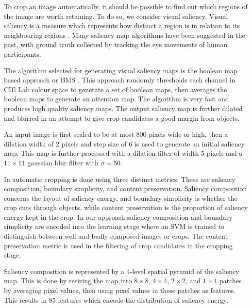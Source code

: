 To crop an image automatically, it should be possible to find out which regions
of the image are worth retaining.
To do so, we consider visual saliency.
Visual saliency is a measure which represents how distinct a region is in
relation to its neighbouring regions \cite{borji2013state}.
Many saliency map algorithms have been suggested in the past, with ground truth
collected by tracking the eye movements of human participants.

The algorithm selected for generating visual saliency maps is the boolean map
based approach or BMS \cite{zhang2013saliency}.
This approach randomly thresholds each channel in CIE Lab colour space to
generate a set of boolean maps, then averages the boolean maps to generate an
attention map.
The algorithm is very fast and produces high quality saliency maps.
The output saliency map is further dilated and blurred in an attempt to give
crop candidates a good margin from objects.

An input image is first scaled to be at most 800 pixels wide or high, then a
dilation width of $2$ pixels and step size of $6$ is used to generate an initial
saliency map.
This map is further processed with a dilation filter of width $5$ pixels and a
$11\times11$ gaussian blur filter with $\sigma=50$.

In \cite{fang2014automatic} automatic cropping is done using three distinct metrics.
These are saliency composition, boundary simplicity, and content preservation.
Saliency composition concerns the layout of saliency energy, and boundary
simplicity is whether the crop cuts through objects, while content preservation
is the proportion of saliency energy kept in the crop.
In our approach saliency composition and boundary simplicity are encoded into
the learning stage where an SVM is trained to distinguish between well and badly
composed images or crops.
The content preservation metric is used in the filtering of crop candidates in
the cropping stage.

Saliency composition is represented by a 4-level spatial pyramid of the saliency
map.
This is done by resizing the map into $8\times8$, $4\times4$, $2\times2$, and
$1\times1$ patches
by averaging pixel values, then using pixel values in these patches as features.
This results in 85 features which encode the distribution of saliency energy.

